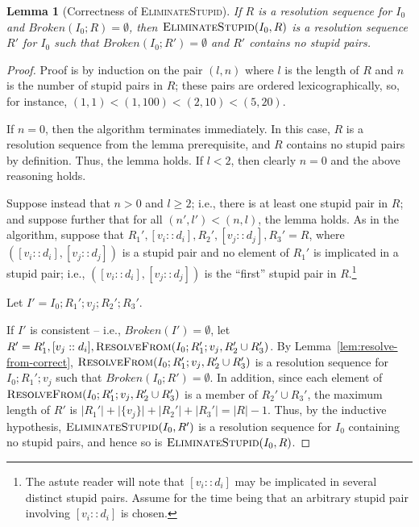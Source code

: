 \documentclass[letterpaper]{article}
\newtheorem{lemma}[theorem]{Lemma}
\theoremstyle{definition}
\theoremstyle{remark}
\newcommand{\len}[1]{\lvert#1\rvert}
\newcommand{\act}[2]{[#1 :: #2]}
\begin{document}
\begin{lemma}[Correctness of \textsc{EliminateStupid}]
  If $R$ is a resolution sequence for $I_0$ and
  $Broken(I_0;R)=\emptyset$, then $\Call{EliminateStupid}{I_0, R}$ is
  a resolution sequence $R'$ for $I_0$ such that $Broken(I_0;R') =
  \emptyset$ and $R'$ contains no stupid pairs.
  \label{lem:eliminate-stupid-correct}
\end{lemma}

\begin{proof}
  Proof is by induction on the pair $(l,n)$ where $l$ is the length of
  $R$ and $n$ is the number of stupid pairs in $R$; these pairs are
  ordered lexicographically, so, for instance, $(1,1) < (1,100) <
  (2,10) < (5,20)$.

  If $n = 0$, then the algorithm terminates immediately.  In this
  case, $R$ is a resolution sequence from the lemma prerequisite, and
  $R$ contains no stupid pairs by definition.  Thus, the lemma holds.
  If $l < 2$, then clearly $n = 0$ and the above reasoning holds.

  Suppose instead that $n > 0$ and $l \geq 2$; i.e., there is at least
  one stupid pair in $R$; and suppose further that for all $(n',l') <
  (n,l)$, the lemma holds.  As in the algorithm, suppose that
  $R_1',\act{v_i}{d_i},R_2',\act{v_j}{d_j},R_3'=R$, where
  $\left(\act{v_i}{d_i},\act{v_j}{d_j}\right)$ is a stupid pair and no
  element of $R_1'$ is implicated in a stupid pair; i.e.,
  $\left(\act{v_i}{d_i},\act{v_j}{d_j}\right)$ is the ``first'' stupid
  pair in $R$.\footnote{The astute reader will note that
    $\act{v_i}{d_i}$ may be implicated in several distinct stupid
    pairs.  Assume for the time being that an arbitrary stupid pair
    involving $\act{v_i}{d_i}$ is chosen.}

  Let $I' = I_0;R_1';v_j;R_2';R_3'$.

  If $I'$ is consistent -- i.e., $Broken(I')=\emptyset$, let $R' =
  R_1',\act{v_j}{d_i},\Call{ResolveFrom}{I_0;R_1';v_j,R_2' \cup
    R_3'}$. By Lemma~\ref{lem:resolve-from-correct},
  $\Call{ResolveFrom}{I_0;R_1';v_j,R_2' \cup R_3'}$ is a resolution
  sequence for $I_0;R_1';v_j$ such that $Broken(I_0;R')=\emptyset$.
  In addition, since each element of
  $\Call{ResolveFrom}{I_0;R_1';v_j,R_2' \cup R_3'}$ is a member of
  $R_2' \cup R_3'$, the maximum length of $R'$ is
  $\len{R_1'}+\len{\{v_j\}}+\len{R_2'}+\len{R_3'}=\len{R}-1$.  Thus,
  by the inductive hypothesis, $\Call{EliminateStupid}{I_0,R'}$ is a
  resolution sequence for $I_0$ containing no stupid pairs, and hence
  so is $\Call{EliminateStupid}{I_0,R}$.


\end{proof}
\end{document}

